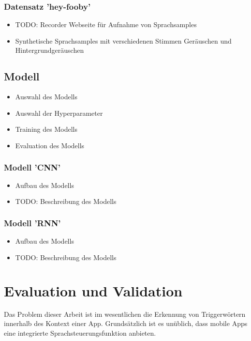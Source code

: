 \documentclass[11pt,a4paper]{article}
\begin{document}
\subsubsection{Datensatz 'hey-fooby'}
\begin{itemize}
    \item TODO: Recorder Webseite für Aufnahme von Sprachsamples
    \item Synthetische Sprachsamples mit verschiedenen Stimmen Geräuschen und Hintergrundgeräuschen
\end{itemize}

\subsection{Modell}
\begin{itemize}
    \item Auswahl des Modells
    \item Auswahl der Hyperparameter
    \item Training des Modells
    \item Evaluation des Modells
\end{itemize}

\subsubsection{Modell 'CNN'}
\begin{itemize}
    \item Aufbau des Modells 
    \item TODO: Beschreibung des Modells
\end{itemize}

\subsubsection{Modell 'RNN'}
\begin{itemize}
    \item Aufbau des Modells 
    \item TODO: Beschreibung des Modells

\end{itemize}



\newpage \section{Evaluation und Validation}
Das Problem dieser Arbeit ist im wesentlichen die Erkennung von Triggerwörtern innerhalb
des Kontext einer App. Grundsätzlich ist es unüblich, dass mobile Apps eine
integrierte Sprachsteuerungsfunktion anbieten.
\end{document}
